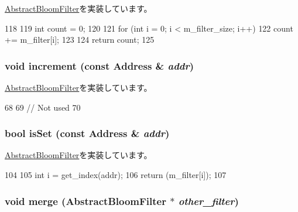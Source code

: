 \hyperlink{classAbstractBloomFilter_a25ea5e1ef3d4911226f37649b6efed22}{AbstractBloomFilter}を実装しています。


\begin{DoxyCode}
118 {
119     int count = 0;
120 
121     for (int i = 0; i < m_filter_size; i++) {
122         count += m_filter[i];
123     }
124     return count;
125 }
\end{DoxyCode}
\hypertarget{classNonCountingBloomFilter_a3e860ad851b771ac3b6eeb1716eb56bc}{
\subsubsection[{increment}]{\setlength{\rightskip}{0pt plus 5cm}void increment (const {\bf Address} \& {\em addr})}}
\label{classNonCountingBloomFilter_a3e860ad851b771ac3b6eeb1716eb56bc}


\hyperlink{classAbstractBloomFilter_af795f7fdeff0174e914ed1d792ffe4ff}{AbstractBloomFilter}を実装しています。


\begin{DoxyCode}
68 {
69     // Not used
70 }
\end{DoxyCode}
\hypertarget{classNonCountingBloomFilter_a4200ee289c3d941a4b209c4788f8087c}{
\subsubsection[{isSet}]{\setlength{\rightskip}{0pt plus 5cm}bool isSet (const {\bf Address} \& {\em addr})}}
\label{classNonCountingBloomFilter_a4200ee289c3d941a4b209c4788f8087c}


\hyperlink{classAbstractBloomFilter_aa1b69d102655f8c5879b3df95eb205dc}{AbstractBloomFilter}を実装しています。


\begin{DoxyCode}
104 {
105     int i = get_index(addr);
106     return (m_filter[i]);
107 }
\end{DoxyCode}
\hypertarget{classNonCountingBloomFilter_a4091f5f95de040d4e0ae5bd86817b13c}{
\subsubsection[{merge}]{\setlength{\rightskip}{0pt plus 5cm}void merge ({\bf AbstractBloomFilter} $\ast$ {\em other\_\-filter})}}
\label{classNonCountingBloomFilter_a4091f5f95de040d4e0ae5bd86817b13c}



